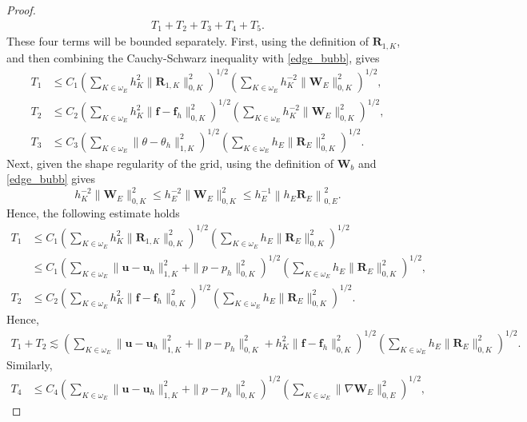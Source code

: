 \documentclass[10pt,a4paper]{article}
\begin{document}
\begin{proof}
\begin{align}
     T_1 + T_2 + T_3 +T_4 +T_5 .
\end{align}
These four terms will be bounded separately.
First, using the definition of $\boldsymbol{R}_{1,K}$, and then combining the Cauchy-Schwarz inequality with \eqref{edge_bubb}, gives
\begin{align*}
    T_1 &\leq C_1 \left(\sum_{K \in \omega_E} h_K^2 \| \boldsymbol{R}_{1,K}  \|^2_{0,K} \right)^{1/2} \left( \sum_{K \in \omega_E}   h_K^{-2} \|\boldsymbol{W}_E \|^2_{0,K} \right)^{1/2}, \\
    T_2 & \leq C_2\left( \sum_{K \in \omega_E} h_K^2 \| \boldsymbol{f} - \boldsymbol{f}_h \|_{0,K}^2  \right)^{1/2} \left( \sum_{K \in \omega_E} h_K^{-2} \|\boldsymbol{W}_E \|^2_{0,K} \right)^{1/2}, \\
    T_3 & \leq C_3 \left( \sum_{K \in \omega_E} \| \theta - \theta_h \|_{1,K}^2  \right)^{1/2} \left( \sum_{K \in \omega_E} h_E  \|\boldsymbol{R}_E \|^2_{0,K} \right)^{1/2}.
\end{align*}
Next, given the shape regularity of the grid, using the definition of $\boldsymbol{W}_b$ and \eqref{edge_bubb} gives
$$
h_K^{-2} \|\boldsymbol{W}_E \|^2_{0,K}  \leq h_E^{-2} \| \boldsymbol{W}_E \|_{0,K}^2 \leq h_E^{-1} \left\| h_E \boldsymbol{R}_E \right\|_{0,E}^2.  
$$
Hence, the following estimate holds 
\begin{align*}
    T_1 &\leq C_1 \left(\sum_{K \in \omega_E} h_K^2 \| \boldsymbol{R}_{1,K}  \|^2_{0,K} \right)^{1/2} \left( \sum_{K \in \omega_E} h_E\|\boldsymbol{R}_E \|^2_{0,K} \right)^{1/2}
    \\ & \leq  C_1 \left(\sum_{K \in \omega_E}  \| \boldsymbol{u} - \boldsymbol{u}_h \|^2_{1,K} + \|p-p_h\|_{0,K}^2  \right)^{1/2} \left( \sum_{K \in \omega_E} h_E \|\boldsymbol{R}_E \|^2_{0,K} \right)^{1/2}, \\
    T_2 & \leq C_2 \left(\sum_{K \in \omega_E} h_K^2 \| \boldsymbol{f} - \boldsymbol{f}_h \|_{0,K}^2  \right)^{1/2} \left( \sum_{K \in \omega_E} h_E  \|\boldsymbol{R}_E \|^2_{0,K} \right)^{1/2}.
\end{align*}
Hence, 
\begin{align*}
    T_1 +T_2 \lesssim \left(\sum_{K \in \omega_E}  \| \boldsymbol{u} - \boldsymbol{u}_h \|^2_{1,K} + \|p-p_h\|_{0,K}^2  + h_K^2 \| \boldsymbol{f} - \boldsymbol{f}_h \|_{0,K}^2  \right)^{1/2} \left( \sum_{K \in \omega_E} h_E \|\boldsymbol{R}_E \|^2_{0,K} \right)^{1/2}.
\end{align*}
Similarly, 
\begin{align*}
 T_4 &\leq C_4 \left( \sum_{K \in \omega_E} \| \boldsymbol{u} - \boldsymbol{u}_h \|^2_{1,K} + \|p-p_h\|_{0,K}^2   \right)^{1/2}  \left(  \sum_{K \in \omega_E} \|\nabla \boldsymbol{W}_E\|^2_{0,E} \right)^{1/2},

\end{align*}
\end{proof}
\end{document}
